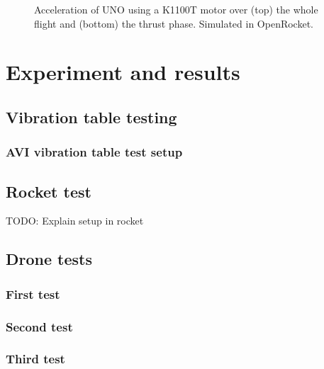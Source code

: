 \documentclass{report}
\begin{document}
\begin{figure}[H]
  
  
  \caption{Acceleration of UNO using a K1100T motor over (top) the whole flight and (bottom) the thrust phase. Simulated in OpenRocket.}
  \label{fig:openrocket-k-acceleration}
\end{figure}


\chapter{Experiment and results}

\section{Vibration table testing}
\subsection{AVI vibration table test setup}



\section{Rocket test}

TODO: Explain setup in rocket


\section{Drone tests}
\subsection{First test}
\subsection{Second test}
\subsection{Third test}

\end{document}
